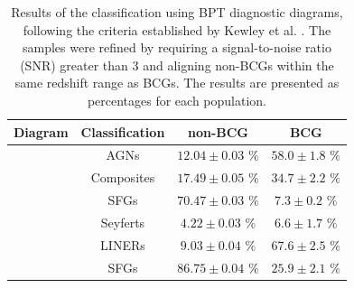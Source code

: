 \begin{table}[htb]
  \centering
  \begin{tabular}{cccc}
    \hline\hline
    \multicolumn{1}{c}{Diagram} & Classification & non-BCG & BCG \\
    \hline
    [NII]  & AGNs & $12.04 \pm 0.03$ $\%$ & $58.0 \pm 1.8$ $\%$ \\
           & Composites & $17.49 \pm 0.05$ $\%$ &  $34.7 \pm 2.2$ $\%$ \\
           & SFGs & $70.47 \pm 0.03$ $\%$ &  $7.3 \pm 0.2$ $\%$ \\ 
    \hline
    [SII]  & Seyferts & $4.22 \pm 0.03$ $\%$  & $6.6 \pm 1.7$ $\%$\\
           & LINERs & $9.03 \pm 0.04$ $\%$  & $67.6 \pm 2.5$ $\%$\\
           & SFGs &$86.75 \pm 0.04$ $\%$  & $25.9 \pm 2.1$ $\%$\\
    \hline\hline
  \end{tabular}
  \caption{Results of the classification using BPT diagnostic diagrams, following the criteria established by Kewley et al. \cite{2006MNRAS.372..961K}. The samples were refined by requiring a signal-to-noise ratio (SNR) greater than 3 and aligning non-BCGs within the same redshift range as BCGs. The results are presented as percentages for each population. }
  \label{tab:Optical2}
\end{table}

